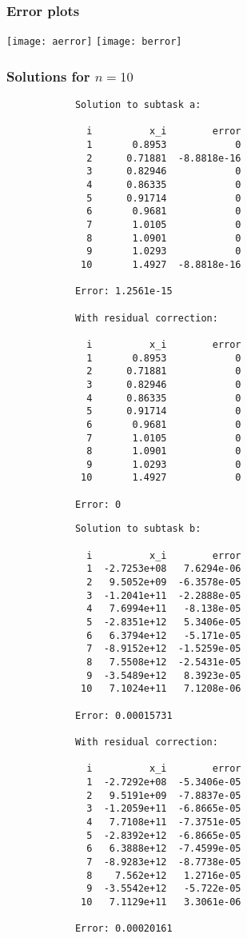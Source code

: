 \documentclass{article}
\begin{document}
	\subsubsection{Error plots}

	\texttt{[image: aerror]}
	\texttt{[image: berror]}

	\subsubsection{Solutions for $n = 10$}

	\begin{multicols}{2}
		\begin{verbatim}
			Solution to subtask a:

			  i          x_i        error
			  1       0.8953            0
			  2      0.71881  -8.8818e-16
			  3      0.82946            0
			  4      0.86335            0
			  5      0.91714            0
			  6       0.9681            0
			  7       1.0105            0
			  8       1.0901            0
			  9       1.0293            0
			 10       1.4927  -8.8818e-16

			Error: 1.2561e-15

			With residual correction:

			  i          x_i        error
			  1       0.8953            0
			  2      0.71881            0
			  3      0.82946            0
			  4      0.86335            0
			  5      0.91714            0
			  6       0.9681            0
			  7       1.0105            0
			  8       1.0901            0
			  9       1.0293            0
			 10       1.4927            0

			Error: 0
		\end{verbatim}
		\begin{verbatim}
			Solution to subtask b:

			  i          x_i        error
			  1  -2.7253e+08   7.6294e-06
			  2   9.5052e+09  -6.3578e-05
			  3  -1.2041e+11  -2.2888e-05
			  4   7.6994e+11   -8.138e-05
			  5  -2.8351e+12   5.3406e-05
			  6   6.3794e+12   -5.171e-05
			  7  -8.9152e+12  -1.5259e-05
			  8   7.5508e+12  -2.5431e-05
			  9  -3.5489e+12   8.3923e-05
			 10   7.1024e+11   7.1208e-06

			Error: 0.00015731

			With residual correction:

			  i          x_i        error
			  1  -2.7292e+08  -5.3406e-05
			  2   9.5191e+09  -7.8837e-05
			  3  -1.2059e+11  -6.8665e-05
			  4   7.7108e+11  -7.3751e-05
			  5  -2.8392e+12  -6.8665e-05
			  6   6.3888e+12  -7.4599e-05
			  7  -8.9283e+12  -8.7738e-05
			  8    7.562e+12   1.2716e-05
			  9  -3.5542e+12   -5.722e-05
			 10   7.1129e+11   3.3061e-06

			Error: 0.00020161
		\end{verbatim}
	\end{multicols}
\end{document}
